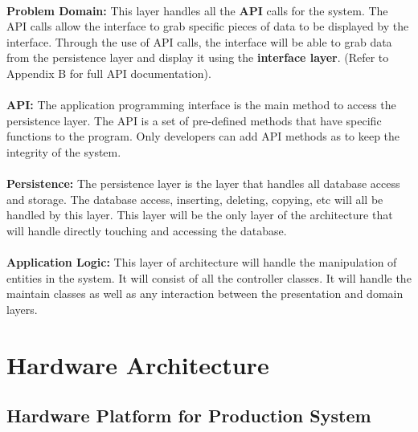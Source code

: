 \documentclass[letterpaper,12pt]{report}
\begin{document}
\paragraph{}\hspace{0.6cm}\textbf{Problem Domain:} This layer handles all the \textbf{API} calls for the system. The API calls allow the interface to grab specific pieces of data to be displayed by the interface. Through the use of API calls, the interface will be able to grab data from the persistence layer and display it using the \textbf{interface layer}. (Refer to Appendix B for full API documentation).
\paragraph{}\hspace{0.6cm}\textbf{API:} The application programming interface is the main method to access the persistence layer. The API is a set of pre-defined methods that have specific functions to the program. Only developers can add API methods as to keep the integrity of the system. 
\paragraph{}\hspace{0.6cm}\textbf{Persistence:} The persistence layer is the layer that handles all database access and storage. The database access, inserting, deleting, copying, etc will all be handled by this layer. This layer will be the only layer of the architecture that will handle directly touching and accessing the database. 
\paragraph{}\hspace{0.6cm}\textbf{Application Logic:} This layer of architecture will handle the manipulation of entities in the system. It will consist of all the controller classes. It will handle the maintain classes as well as any interaction between the presentation and domain layers.

\pagebreak
\section{Hardware Architecture}

\subsection{Hardware Platform for Production System}
\end{document}
